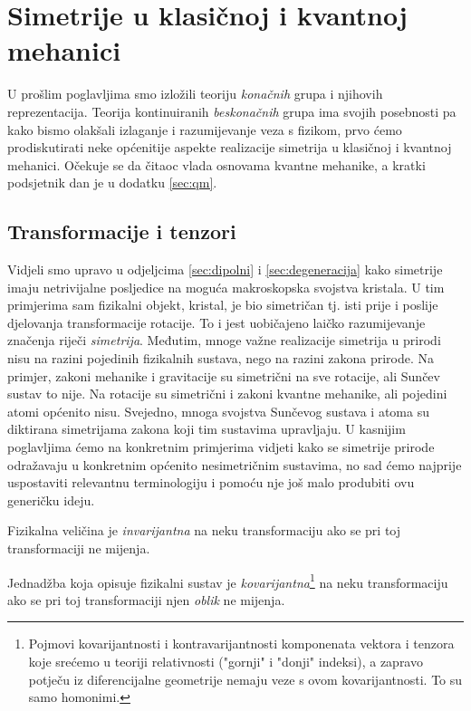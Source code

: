 
\chapter{Simetrije u klasičnoj i kvantnoj mehanici}
\label{ch:klasicna}

U prošlim poglavljima smo izložili teoriju \emph{konačnih} grupa i njihovih reprezentacija.
Teorija kontinuiranih \emph{beskonačnih} grupa ima svojih posebnosti pa kako
bismo olakšali izlaganje i razumijevanje veza s fizikom, prvo ćemo
prodiskutirati neke općenitije aspekte realizacije simetrija u klasičnoj
i kvantnoj mehanici. Očekuje se da čitaoc vlada osnovama kvantne mehanike,
a kratki podsjetnik dan je u dodatku \ref{sec:qm}.


\section{Transformacije i tenzori}
\label{sec:tenzori}

Vidjeli smo upravo u odjeljcima \ref{sec:dipolni} i \ref{sec:degeneracija} kako
simetrije imaju netrivijalne posljedice na moguća makroskopska
svojstva kristala. U tim primjerima sam fizikalni objekt, kristal, je bio
simetričan tj. isti prije i poslije djelovanja transformacije rotacije.
To i jest uobičajeno laičko razumijevanje značenja riječi \emph{simetrija}. Međutim,
mnoge važne realizacije simetrija u prirodi nisu na razini pojedinih
fizikalnih sustava, nego na razini zakona prirode. Na primjer, zakoni mehanike
i gravitacije su simetrični na sve rotacije, ali Sunčev sustav to nije.
Na rotacije su simetrični i zakoni kvantne mehanike, ali pojedini atomi općenito
nisu.
Svejedno, mnoga svojstva Sunčevog sustava i atoma su diktirana simetrijama
zakona koji tim sustavima upravljaju.
U kasnijim poglavljima ćemo na konkretnim primjerima vidjeti kako se simetrije
prirode odražavaju u konkretnim općenito nesimetričnim sustavima, no
sad ćemo najprije uspostaviti relevantnu terminologiju i pomoću nje još
malo produbiti ovu generičku ideju.


\begin{definicija}
Fizikalna veličina je \emph{invarijantna} na neku transformaciju ako se
pri toj transformaciji ne mijenja.

Jednadžba koja opisuje fizikalni sustav je \emph{kovarijantna}\footnote{%
Pojmovi kovarijantnosti i kontravarijantnosti
komponenata vektora i tenzora koje srećemo u teoriji relativnosti
("gornji" i "donji" indeksi), a zapravo potječu iz diferencijalne 
geometrije nemaju veze s ovom kovarijantnosti.  To su samo homonimi.}
na neku transformaciju ako se pri toj transformaciji 
njen \emph{oblik} ne mijenja.
\end{definicija}


